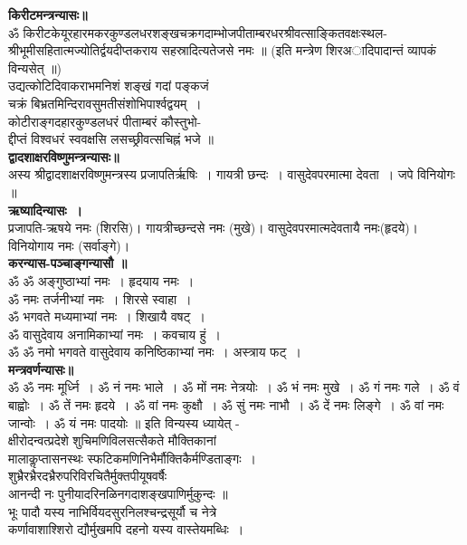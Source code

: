 \documentclass[twoside,top=1.7cm, bottom=1.7cm, outer=1cm,landscape, inner=1.5cm,a5paper,]{book}
\begin{document}
{\bfseries किरीटमन्त्रन्यासः॥}\\
ॐ किरीटकेयूरहारमकरकुण्डलधरशङ्खचक्रगदाम्भोजपीताम्बरधरश्रीवत्साङ्कितवक्षःस्थल-\\श्रीभूमीसहितात्मज्योतिर्द्वयदीप्तकराय सहस्रादित्यतेजसे नमः ॥ (इति मन्त्रेण शिरअादिपादान्तं व्यापकं विन्यसेत् ॥)\\
उद्यत्कोटिदिवाकराभमनिशं शङ्खं गदां पङ्कजं\\
 चक्रं बिभ्रतमिन्दिरावसुमतीसंशोभिपार्श्वद्वयम्~।\\
कोटीराङ्गदहारकुण्डलधरं पीताम्बरं कौस्तुभो-\\
द्दीप्तं विश्वधरं स्ववक्षसि लसच्छ्रीवत्सचिह्नं भजे ॥\\[10pt]
{\bfseries द्वादशाक्षरविष्णुमन्त्रन्यासः॥}\\
अस्य श्रीद्वादशाक्षरविष्णुमन्त्रस्य प्रजापतिर्ऋषिः~। गायत्री छन्दः~। वासुदेवपरमात्मा देवता~। जपे विनियोगः ॥\\
{\bfseries ऋष्यादिन्यासः~।}\\
प्रजापति-ऋषये नमः (शिरसि)। गायत्रीच्छन्दसे नमः (मुखे)। वासुदेवपरमात्मदेवतायै नमः(हृदये)। विनियोगाय नमः (सर्वाङ्गे)। \\[10pt]
{\bfseries करन्यास-पञ्चाङ्गन्यासौ ॥}\\
ॐ ॐ अङ्गुष्ठाभ्यां नमः~। हृदयाय नमः~।\\
ॐ नमः	तर्जनीभ्यां नमः~। शिरसे स्वाहा~।\\
ॐ भगवते मध्यमाभ्यां नमः~। शिखायै वषट्~।\\
ॐ वासुदेवाय अनामिकाभ्यां नमः~। कवचाय हुं~।\\
ॐ ॐ नमो भगवते वासुदेवाय कनिष्ठिकाभ्यां नमः~। अस्त्राय फट्~।\\
{\bfseries मन्त्रवर्णन्यासः॥}\\
ॐ ॐ नमः मूर्ध्नि~। ॐ नं  नमः भाले~। ॐ मों नमः नेत्रयोः~। 
ॐ भं नमः मुखे~। ॐ गं नमः गले~। ॐ वं बाह्वोः~। 
ॐ तें नमः हृदये~। ॐ वां नमः कुक्षौ~। ॐ सुं नमः नाभौ~। ॐ दें नमः लिङ्गे~। ॐ वां नमः जान्वोः~। ॐ यं नमः पादयोः ॥
 इति विन्यस्य ध्यायेत् -\\
क्षीरोदन्वत्प्रदेशे शुचिमणिविलसत्सैकते मौक्तिकानां\\
     मालाकॢप्तासनस्थः स्फटिकमणिनिभैर्मौक्तिकैर्मण्डिताङ्गः~।\\
शुभ्रैरभ्रैरदभ्रैरुपरिविरचितैर्मुक्तपीयूषवर्षैः\\
     आनन्दी नः पुनीयादरिनळिनगदाशङ्खपाणिर्मुकुन्दः ॥\\[10pt]
भूः पादौ यस्य नाभिर्वियदसुरनिलश्चन्द्रसूर्यौ च नेत्रे\\
     कर्णावाशाश्शिरो द्यौर्मुखमपि दहनो यस्य वास्तेयमब्धिः~।\\[10pt]
\end{document}
